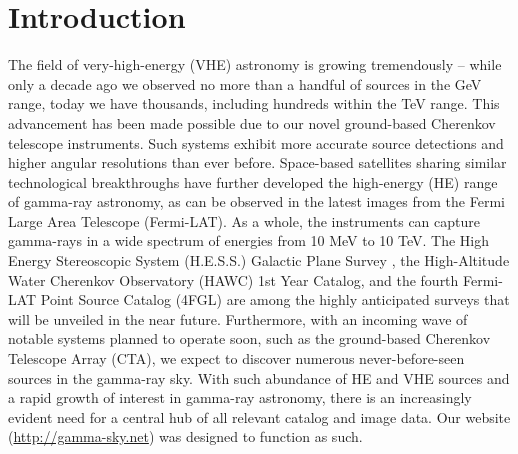 \section{Introduction}

The field of very-high-energy (VHE) astronomy is growing tremendously – while only a decade ago we observed no more than a handful of sources in the GeV range, today we have thousands, including hundreds within the TeV range. This advancement has been made possible due to our novel ground-based Cherenkov telescope instruments. Such systems exhibit more accurate source detections and higher angular resolutions than ever before. Space-based satellites sharing similar technological breakthroughs have further developed the high-energy (HE) range of gamma-ray astronomy, as can be observed in the latest images from the Fermi Large Area Telescope (Fermi-LAT). As a whole, the instruments can capture gamma-rays in a wide spectrum of energies from 10 MeV to 10 TeV. The High Energy Stereoscopic System (H.E.S.S.) Galactic Plane Survey \cite{hgps}, the High-Altitude Water Cherenkov Observatory (HAWC) 1st Year Catalog, and the fourth Fermi-LAT Point Source Catalog (4FGL) are among the highly anticipated surveys that will be unveiled in the near future. Furthermore, with an incoming wave of notable systems planned to operate soon, such as the ground-based Cherenkov Telescope Array (CTA), we expect to discover numerous never-before-seen sources in the gamma-ray sky. With such abundance of HE and VHE sources and a rapid growth of interest in gamma-ray astronomy, there is an increasingly evident need for a central hub of all relevant catalog and image data. Our website (\url{http://gamma-sky.net}) was designed to function as such.

%

